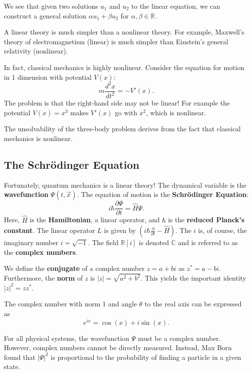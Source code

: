     We see that given two solutions $u_1$ and $u_2$ to the linear equation, we can construct a general solution $\alpha u_1+\beta u_2$ for $\alpha,\beta\in\mathbb{R}$.

    A linear theory is much simpler than a nonlinear theory. For example, Maxwell's theory of electromagnetism (linear) is much simpler than Einstein's general relativity (nonlinear). 
    
    In fact, classical mechanics is highly nonlinear. Consider the equation for motion in 1 dimension with potential $V(x)$: $$m\frac{d^2x}{dt^2}=-V'(x).$$The problem is that the right-hand side may not be linear! For example the potential $V(x)=x^3$ makes $V'(x)$ go with $x^2$, which is nonlinear.

    \begin{framedexpl}
        The unsolvability of the three-body problem derives from the fact that classical mechanics is nonlinear.
    \end{framedexpl}

    \subsection{The Schrödinger Equation}\label{schrodinger}
    
    Fortunately, quantum mechanics is a linear theory! The dynamical variable is the \textbf{wavefunction} $\Psi(t,\vec{x})$. The equation of motion is the \textbf{Schrödinger Equation}: $$i\hbar\frac{\partial\Psi}{\partial t}=\hat{H}\Psi.$$Here, $\hat{H}$ is the \textbf{Hamiltonian}, a linear operator, and $\hbar$ is the \textbf{reduced Planck's constant}. The linear operator $L$ is given by $(i\hbar\frac{\partial}{\partial t}-\hat{H})$. The $i$ is, of course, the imaginary number $i=\sqrt{-1}$. The field $\mathbb{R}[i]$ is denoted $\mathbb{C}$ and is referred to as the \textbf{complex numbers}. 

    We define the \textbf{conjugate} of a complex number $z=a+bi$ as $z^*=a-bi$. Furthermore, the \textbf{norm} of $z$ is $|z|=\sqrt{a^2+b^2}$. This yields the important identity $|z|^2=zz^*$.
    
    \begin{framedthm}
        The complex number with norm 1 and angle $\theta$ to the real axis can be expressed as $$e^{ix}=\cos(x)+i\sin(x).$$
    \end{framedthm}
    
    For all physical systems, the wavefunction $\Psi$ must be a complex number. However, complex numbers cannot be directly measured. Instead, Max Born found that $|\Psi|^2$  is proportional to the probability of finding a particle in a given state.

